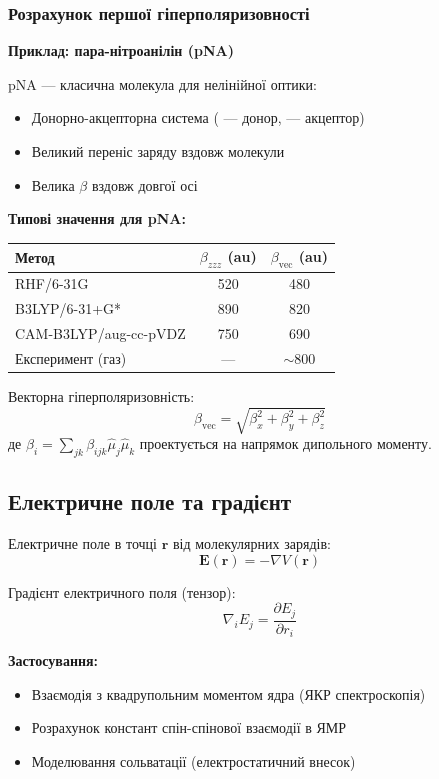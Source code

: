 \subsubsection{Розрахунок першої гіперполяризовності}


\textbf{Приклад: пара-нітроанілін (pNA)}

pNA --- класична молекула для нелінійної оптики:
\begin{itemize}
    \item Донорно-акцепторна система ( --- донор,  --- акцептор)
    \item Великий переніс заряду вздовж молекули
    \item Велика $\beta$ вздовж довгої осі
\end{itemize}

\textbf{Типові значення для pNA:}
\begin{center}
\begin{tabular}{lcc}
\toprule
Метод & $\beta_{zzz}$ (au) & $\beta_{\text{vec}}$ (au) \\
\midrule
RHF/6-31G          & 520  & 480 \\
B3LYP/6-31+G*      & 890  & 820 \\
CAM-B3LYP/aug-cc-pVDZ & 750 & 690 \\
\midrule
Експеримент (газ)  & ---  & $\sim$800 \\
\bottomrule
\end{tabular}
\end{center}

Векторна гіперполяризовність:
\[
\beta_{\text{vec}} = \sqrt{\beta_x^2 + \beta_y^2 + \beta_z^2}
\]
де $\beta_i = \sum_{jk} \beta_{ijk} \hat{\mu}_j \hat{\mu}_k$ проектується
на напрямок дипольного моменту.

\subsection{Електричне поле та градієнт}

Електричне поле в точці $\mathbf{r}$ від молекулярних зарядів:
\[
\mathbf{E}(\mathbf{r}) = -\nabla V(\mathbf{r})
\]

Градієнт електричного поля (тензор):
\[
\nabla_i E_j = \frac{\partial E_j}{\partial r_i}
\]

\textbf{Застосування:}
\begin{itemize}
    \item Взаємодія з квадрупольним моментом ядра (ЯКР спектроскопія)
    \item Розрахунок констант спін-спінової взаємодії в ЯМР
    \item Моделювання сольватації (електростатичний внесок)
\end{itemize}

